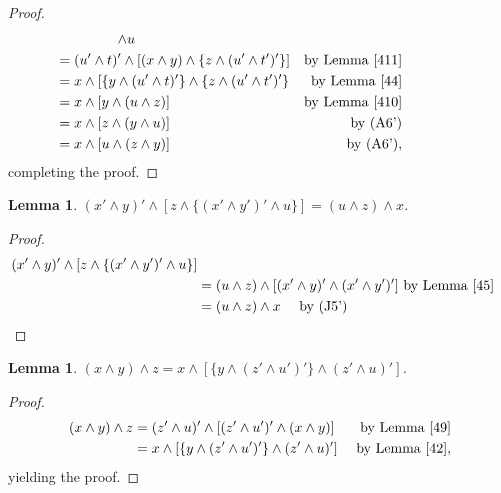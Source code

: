 \documentclass{amsart}
\theoremstyle{plain}
\newtheorem{lemma}[theorem]{Lemma}
\theoremstyle{problem}
\theoremstyle{definition}
\theoremstyle{remark}
\numberwithin{equation}{section}
\begin{document}
\begin{proof} 
\begin{align*}
    [(x \land y) \land z] \land u \\
        &{\hspace{-2cm}}=(u' \land t)' \land [(x \land y) \land \{z \land (u' \land t')' \}] &\text{by Lemma \ref{411}}\\  
        &{\hspace{-2cm}}= x \land [\{y \land (u' \land t)'\} \land \{z \land (u' \land t')' \}  &\text{by Lemma \ref{44}}\\ 
        &{\hspace{-2cm}}= x \land [y \land (u \land z)] &\text{by Lemma \ref{410}}\\ 
        &{\hspace{-2cm}}= x \land [z \land (y \land u)] &\text{by (A6')}\\
        &{\hspace{-2cm}}= x \land [u \land (z \land y)] &\text{by (A6')}, 
\end{align*}
completing the proof.
\end{proof}



\begin{lemma} \label{412a}
    $(x' \land y)' \land [z \land \{(x' \land y')' \land u \}] = (u \land z) \land x$.
\end{lemma}

\begin{proof}
\begin{align*}
    (x' \land y)' \land [z \land \{(x' \land y')' \land u \}]\\
               &= (u \land z) \land [(x' \land y)' \land (x' \land y')'] \text{ by Lemma \ref{45}}\\ 
               &= (u \land z) \land x  \quad \text{  by (J5')}
\end{align*}
\end{proof}


\begin{lemma}\label{413}
    $(x \land y) \land z = x \land [\{y \land (z' \land u')'\} \land (z' \land u)']$.
\end{lemma}

\begin{proof}
\begin{align*}
    (x \land y) \land z &= (z' \land u)' \land [(z' \land u')' \land (x \land y)] &\text{ by Lemma \ref{49}} \\      
         &= x \land [\{y \land (z' \land u')'\} \land (z' \land u)'] &\text{ by Lemma \ref{42}},  
\end{align*}
yielding the proof.
\end{proof}
\end{document}

